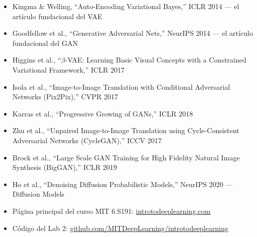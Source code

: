 \documentclass[a4paper]{article}
\begin{document}
\begin{itemize}
    \item Kingma \& Welling, ``Auto-Encoding Variational Bayes,'' ICLR 2014 --- el artículo fundacional del VAE
    \item Goodfellow et al., ``Generative Adversarial Nets,'' NeurIPS 2014 --- el artículo fundacional del GAN
    \item Higgins et al., ``$\beta$-VAE: Learning Basic Visual Concepts with a Constrained Variational Framework,'' ICLR 2017
    \item Isola et al., ``Image-to-Image Translation with Conditional Adversarial Networks (Pix2Pix),'' CVPR 2017
    \item Karras et al., ``Progressive Growing of GANs,'' ICLR 2018
    \item Zhu et al., ``Unpaired Image-to-Image Translation using Cycle-Consistent Adversarial Networks (CycleGAN),'' ICCV 2017
    \item Brock et al., ``Large Scale GAN Training for High Fidelity Natural Image Synthesis (BigGAN),'' ICLR 2019
    \item Ho et al., ``Denoising Diffusion Probabilistic Models,'' NeurIPS 2020 --- Diffusion Models
    \item Página principal del curso MIT 6.S191: \href{https://introtodeeplearning.com}{introtodeeplearning.com}
    \item Código del Lab 2: \href{https://github.com/MITDeepLearning/introtodeeplearning}{github.com/MITDeepLearning/introtodeeplearning}
\end{itemize}

\end{document}
